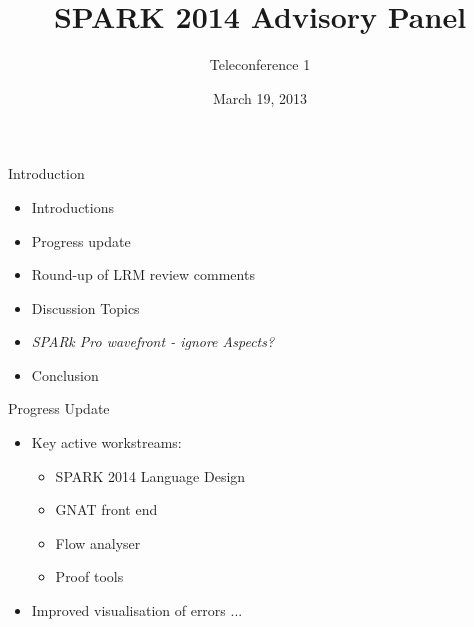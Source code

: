 \documentclass{beamer}
\title{SPARK 2014 Advisory Panel}
\subtitle{Teleconference 1}
\date{March 19, 2013}
\begin{document}
\begin{altrantitle}
\end{altrantitle}

\begin{frame}{Introduction}

  \begin{itemize}

  \item Introductions
  \item Progress update
  \item Round-up of LRM review comments
  \item Discussion Topics
  \item \emph{SPARk Pro wavefront - ignore Aspects?}
  \item Conclusion

  \end{itemize}

  \end{frame}

\begin{frame}{Progress Update}

  \begin{itemize}

  \item Key active workstreams:
  
    \begin{itemize}
    \item SPARK 2014 Language Design
    \item GNAT front end
    \item Flow analyser
    \item Proof tools
    \end{itemize}

  \item Improved visualisation of errors ...

  \end{itemize}

\end{frame}
\end{document}

